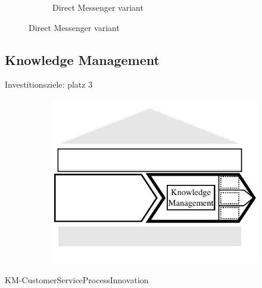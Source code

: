 \begin{figure}[caption={Evaluate contact detail process}, label={fig:outbound:eval}]
\begin{subfigure}[b]{.45\textwidth}
\begin{tikzpicture}
		\end{tikzpicture}
		\caption{Direct Messenger variant}\label{fig:outbound:eval:dm}
	\end{subfigure}
\end{figure}


		

	\subsection{Knowledge Management}
	Investitionsziele: platz 3 \citep{ccnet2016}
	\begin{figure}[caption={Knowlege Management detail process}, label={fig:knowledge}]
		\begin{subfigure}[b]{.45\textwidth}
			\begin{center}
				\includegraphics{figures/knowledgemanagement.pdf}
			\end{center}
		\end{subfigure}
	\begin{subfigure}[b]{.45\textwidth}
		\begin{center}
		\end{center}
	\end{subfigure}
	
\end{figure}

	KM-CustomerServiceProcessInnovation
